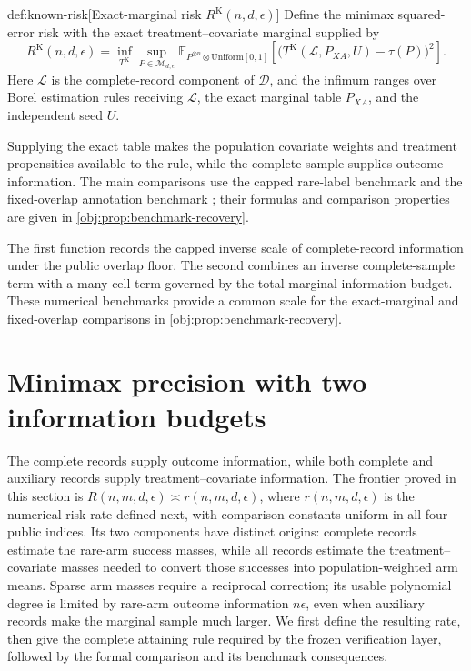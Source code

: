 \documentclass[11pt]{article}
\begin{document}
\begin{definitionv}{def:known-risk}[Exact-marginal risk $R^{\mathrm K}(n,d,\epsilon)$]
Define the minimax squared-error risk with the exact treatment--covariate marginal supplied by
\[
R^{\mathrm K}(n,d,\epsilon)
=
\inf_{T^{\mathrm K}}\sup_{P\in\mathcal M_{d,\epsilon}}
\mathbb E_{P^{\otimes n}\otimes\mathrm{Uniform}[0,1]}
\left[
\bigl(T^{\mathrm K}(\mathcal L,P_{XA},U)-\tau(P)\bigr)^2
\right].
\]
Here \(\mathcal L\) is the complete-record component of \(\mathcal D\), and the infimum ranges over Borel estimation rules receiving \(\mathcal L\), the exact marginal table \(P_{XA}\), and the independent seed \(U\).
\end{definitionv}

Supplying the exact table makes the population covariate weights and treatment propensities available to the rule, while the complete sample supplies outcome information. The main comparisons use the capped rare-label benchmark  and the fixed-overlap annotation benchmark ; their formulas and comparison properties are given in \cref{obj:prop:benchmark-recovery}.



The first function records the capped inverse scale of complete-record information under the public overlap floor. The second combines an inverse complete-sample term with a many-cell term governed by the total marginal-information budget. These numerical benchmarks provide a common scale for the exact-marginal and fixed-overlap comparisons in \cref{obj:prop:benchmark-recovery}.


\section{Minimax precision with two information budgets}

The complete records supply outcome information, while both complete and auxiliary records supply treatment--covariate information. The frontier proved in this section is \(R(n,m,d,\epsilon)\asymp r(n,m,d,\epsilon)\), where \(r(n,m,d,\epsilon)\) is the numerical risk rate defined next, with comparison constants uniform in all four public indices. Its two components have distinct origins: complete records estimate the rare-arm success masses, while all records estimate the treatment--covariate masses needed to convert those successes into population-weighted arm means. Sparse arm masses require a reciprocal correction; its usable polynomial degree is limited by rare-arm outcome information \(n\epsilon\), even when auxiliary records make the marginal sample much larger. We first define the resulting rate, then give the complete attaining rule required by the frozen verification layer, followed by the formal comparison and its benchmark consequences.
\end{document}
